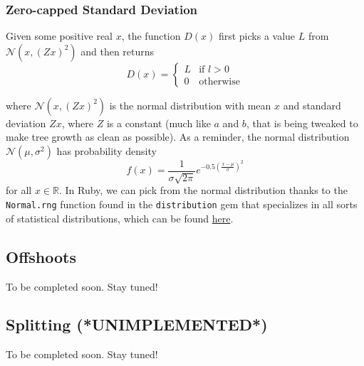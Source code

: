 \subsubsection{Zero-capped Standard Deviation}

Given some positive real $x$, the function $D(x)$ first picks a value $L$ from $\mathcal{N}(x,(Zx)^2)$ and then returns
$$D(x) = \begin{cases}
L & \text{if } l > 0 \\
0 & \text{otherwise}
\end{cases}$$

where $\mathcal{N}(x,(Zx)^2)$ is the normal distribution with mean $x$ and standard deviation $Zx$, where $Z$ is a constant (much like $a$ and $b$, that is being tweaked to make tree growth as clean as possible). As a reminder, the normal distribution $\mathcal{N}(\mu,\sigma^2)$ has probability density
$$f(x) = \frac{1}{\sigma\sqrt{2\pi}}e^{-0.5\left(\frac{x-\mu}{\sigma}\right)^2}$$
for all $x \in \mathbb{R}$. In Ruby, we can pick from the normal distribution thanks to the \verb|Normal.rng| function found in the \verb|distribution| gem that specializes in all sorts of statistical distributions, which can be found \href{https://rubygems.org/gems/distribution}{here}.

\subsection{Offshoots}

To be completed soon. Stay tuned!

\subsection{Splitting (*UNIMPLEMENTED*)}

To be completed soon. Stay tuned!

